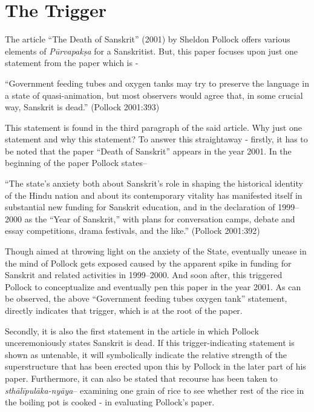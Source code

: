 \section{The Trigger}
 
The article “The Death of Sanskrit” (2001) by Sheldon Pollock offers various elements of {\sl Pūrvapakṣa} for a Sanskritist. But, this paper focuses upon just one statement from the paper which is - 
\smallskip
\begin{myquote}
\eleven
“Government feeding tubes and oxygen tanks may try to preserve the language in a state of quasi-animation, but most observers would agree that, in some crucial way, Sanskrit is dead.” \hfill(Pollock 2001:393)
\end{myquote}
\smallskip

This statement is found in the third paragraph of the said article. Why just one statement and why this statement?  To answer this straightaway - firstly, it has to be noted that the paper ``Death of Sanskrit'' appears in the year 2001.  In the beginning of the paper Pollock states–
\smallskip

\begin{myquote}
\eleven
“The state’s anxiety both about Sanskrit’s role in shaping the historical identity of the Hindu nation and about its contemporary vitality has manifested itself in substantial new funding for Sanskrit education, and in the declaration of 1999--2000 as the “Year of Sanskrit,” with plans for conversation camps, debate and essay competitions, drama festivals, and the like.” \hfill (Pollock 2001:392)  
\end{myquote}
\smallskip
 
Though aimed at throwing light on the anxiety of the State, eventually unease in the mind of Pollock gets exposed caused by the apparent spike in funding for Sanskrit and related activities in 1999--2000. And soon after, this triggered Pollock to conceptualize and eventually pen this paper in the year 2001. As can be observed, the above “Government feeding tubes oxygen tank” statement, directly indicates that trigger, which is at the root of the paper.

Secondly, it is also the first statement in the article in which Pollock unceremoniously states Sanskrit is dead. If this trigger-indicating statement is shown as untenable, it will symbolically indicate the relative strength of the superstructure that has been erected upon this by Pollock in the later part of his paper. Furthermore, it can also be stated that recourse has been taken to {\sl sthālīpulāka-nyāya}– examining one grain of rice to see whether rest of the rice in the boiling pot is cooked - in evaluating Pollock’s paper.

